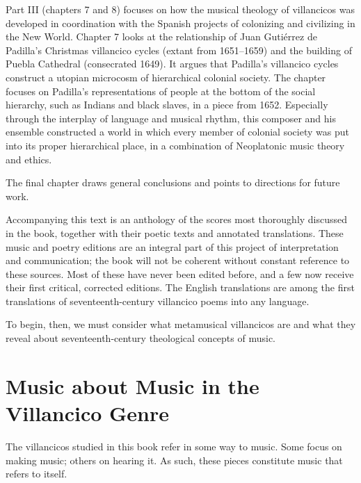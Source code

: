 \documentclass{memoir}
\begin{document}
{{{      Part III (chapters 7 and 8) focuses on how the musical theology of villancicos was developed in coordination with the Spanish projects of colonizing and civilizing in the New World.
      Chapter 7 looks at the relationship of Juan Gutiérrez de Padilla’s Christmas villancico cycles (extant from 1651--1659) and the building of Puebla Cathedral (consecrated 1649).
      It argues that Padilla’s villancico cycles construct a utopian microcosm of hierarchical colonial society.
      The chapter focuses on Padilla’s representations of people at the bottom of the social hierarchy, such as Indians and black slaves, in a piece from 1652.
      Especially through the interplay of language and musical rhythm, this composer and his ensemble constructed a world in which every member of colonial society was put into its proper hierarchical place, in a combination of Neoplatonic music theory and ethics.
      
      The final chapter draws general conclusions and points to directions for future work.
    
      Accompanying this text is an anthology of the scores most thoroughly discussed in the book, together with their poetic texts and annotated translations.
      These music and poetry editions are an integral part of this project of interpretation and communication; the book will not be coherent without constant reference to these sources.
      Most of these have never been edited before, and a few now receive their first critical, corrected editions.
      The English translations are among the first translations of seventeenth-century villancico poems into any language.
    
      To begin, then, we must consider what metamusical villancicos are and what they reveal about seventeenth-century theological concepts of music.
    
    \section{Music about Music in the Villancico Genre}
    \label{}
    
      The villancicos studied in this book refer in some way to music.
      Some focus on making music; others on hearing it.
      As such, these pieces constitute music that refers to itself.
    
}}}
\end{document}
